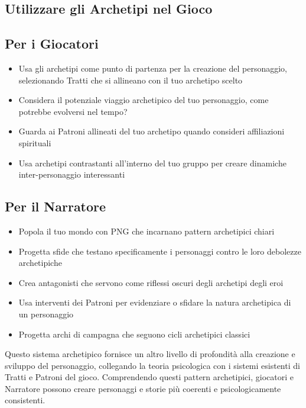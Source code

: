 \begin{multicols}{2}
\begin{tabularx}{\columnwidth}{lX}
\end{tabularx}

\subsection*{Utilizzare gli Archetipi nel Gioco}

\subsection*{Per i Giocatori}
\noindent\begin{itemize}[leftmargin=*] \setlength{\itemsep}{0pt}
\item Usa gli archetipi come punto di partenza per la creazione del personaggio, selezionando Tratti che si allineano con il tuo archetipo scelto
\item Considera il potenziale viaggio archetipico del tuo personaggio, come potrebbe evolversi nel tempo?
\item Guarda ai Patroni allineati del tuo archetipo quando consideri affiliazioni spirituali
\item Usa archetipi contrastanti all'interno del tuo gruppo per creare dinamiche inter-personaggio interessanti
\end{itemize}

\subsection*{Per il Narratore}
\noindent\begin{itemize}[leftmargin=*] \setlength{\itemsep}{0pt}
\item Popola il tuo mondo con PNG che incarnano pattern archetipici chiari
\item Progetta sfide che testano specificamente i personaggi contro le loro debolezze archetipiche
\item Crea antagonisti che servono come riflessi oscuri degli archetipi degli eroi
\item Usa interventi dei Patroni per evidenziare o sfidare la natura archetipica di un personaggio
\item Progetta archi di campagna che seguono cicli archetipici classici
\end{itemize}

\begin{narratore}
Questo sistema archetipico fornisce un altro livello di profondità alla creazione e sviluppo del personaggio, collegando la teoria psicologica con i sistemi esistenti di Tratti e Patroni del gioco. Comprendendo questi pattern archetipici, giocatori e Narratore possono creare personaggi e storie più coerenti e psicologicamente consistenti.


\end{narratore}
\end{multicols}
